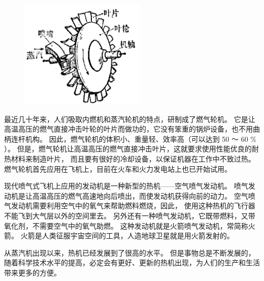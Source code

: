 \begin{figure}
    \centering
    \includegraphics[width=6cm]{../pic/czwl2-ch6-4}
    \caption{}\label{fig:6-4}
\end{figure}

最近几十年来，人们吸取内燃机和蒸汽轮机的特点，研制成了燃气轮机。
它是让高温高压的燃气直接冲击叶轮的叶片而做功的，它没有笨重的锅炉设备，也不用曲柄连杆机构。
因此，燃气轮机的体积小、重量轻、效率高（可以达到 50 ～ 60 \% ）。
但是，燃气轮机让高温高压的燃气直接冲击叶片，这就要求使用性能优良的耐热材料来制造叶片，
而且要有很好的冷却设备，以保证机器在工作中不致过热。
燃气轮机首先应用在飞机上，目前在火车和火力发电站上也已开始试用。

现代喷气式飞机上应用的发动机是一种新型的热机——空气喷气发动机。
喷气发动机是让高温高压的燃气高速地向后喷出，而使发动机获得向前的动力。
空气喷气发动机需要利用空气中的氧气来帮助燃料燃烧，因此，
使用这种热机的飞行器不能飞到大气层以外的空间里去。
另外还有一种喷气发动机，它既带燃料，又带氧化剂，不需要空气中的氧气助燃。
这种发动机就是火箭喷气发动机，常简称火箭。
火箭是人类征服宇宙空间的工具，人造地球卫星就是用火箭发射的。

从蒸汽机出现以来，热机已经发展到了很高的水平。
但是事物总是不断发展的，随着科学技术水平的提高，必定会有更好、更新的热机出现，为人们的生产和生活带来更多的方便。

